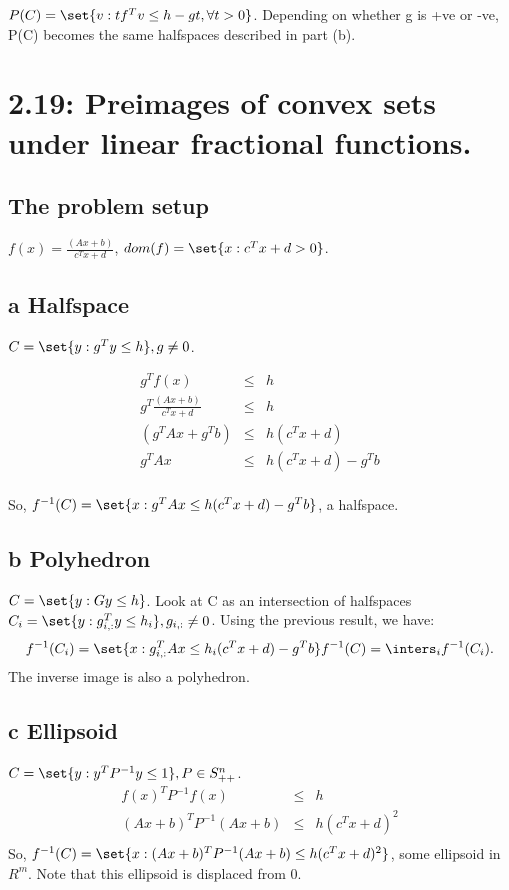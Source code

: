 \documentclass{article}
\begin{document}
$P(C) = \set{v: tf^{T}v \leq h - gt, \forall t>0}$. Depending on whether g is +ve or -ve, P(C) becomes the same halfspaces described in part (b).

\section{2.19: Preimages of convex sets under linear fractional functions.}
\subsection{The problem setup}
$f(x) = \frac{(Ax + b)}{c^{T}x + d}$, $dom(f) = \set{x: c^{T}x +d > 0}$.

\subsection{a Halfspace}
$C = \set{y: g^{T}y \leq h}, g\neq 0$.

\begin{eqnarray*}
g^{T}f(x) &\leq& h\\
g^{T}\frac{(Ax + b)}{c^{T}x + d} &\leq& h\\
(g^{T}Ax + g^{T}b) &\leq& h(c^{T}x + d)\\
g^{T}A x&\leq& h(c^{T}x + d) - g^{T}b\\
\end{eqnarray*}

So, $f^{-1}(C) = \set{x: g^{T}A x \leq h(c^{T}x + d) - g^{T}b}$, a halfspace.

\subsection{b Polyhedron}
$C = \set{y: Gy \leq h}$. Look at C as an intersection of halfspaces \\
$C_i = \set{y: g_{i,:}^{T}y \leq h_i}, g_{i, :}\neq 0$. Using the previous result, we have:
\begin{equation}
f^{-1}(C_i) =  \set{x: g_{i,:}^{T}A x \leq h_i(c^{T}x + d) - g^{T}b}\\
f^{-1}(C) = \inters_i f^{-1}(C_i).
\end{equation}
The inverse image is also a polyhedron.

\subsection{c Ellipsoid}
$C = \set{y: y^{T}P^{-1}y \leq 1}, P \in S_{++}^{n}$.
\begin{eqnarray*}
f(x)^{T}P^{-1}f(x) &\leq& h\\
(Ax + b)^{T}P^{-1}(Ax + b) &\leq& h(c^{T}x + d)^{2}\\
\end{eqnarray*}
So, $f^{-1}(C) = \set{x: (Ax + b)^{T}P^{-1}(Ax + b) \leq h(c^{T}x + d)^{2}}$, some ellipsoid in $R^{m}$. Note that this ellipsoid is displaced from 0.
\end{document}
